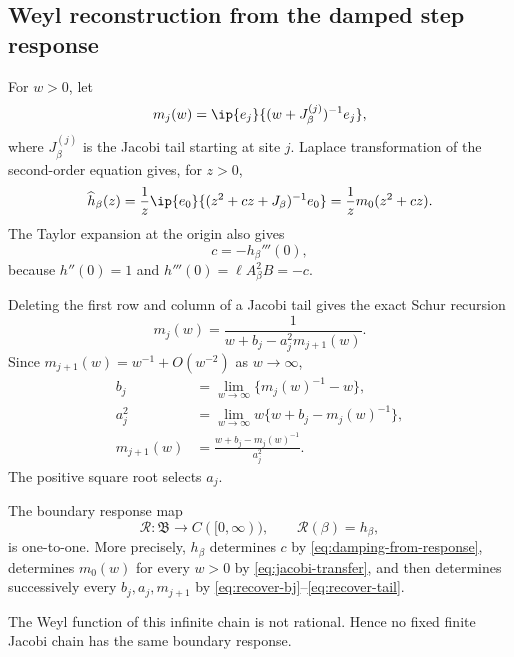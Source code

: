 \subsection{Weyl reconstruction from the damped step response}

For \(w>0\), let
\[
 m_j(w)=\ip{e_j}{(w+J_\beta^{(j)})^{-1}e_j},
\]
where \(J_\beta^{(j)}\) is the Jacobi tail starting at site \(j\).  Laplace
transformation of the second-order equation gives, for \(z>0\),
\begin{equation}
 \widehat h_\beta(z)
 =\frac1z\ip{e_0}{(z^2+cz+J_\beta)^{-1}e_0}
 =\frac1z m_0(z^2+cz).
 \label{eq:jacobi-transfer}
\end{equation}
The Taylor expansion at the origin also gives
\begin{equation}
 c=-h_\beta'''(0),
 \label{eq:damping-from-response}
\end{equation}
because \(h''(0)=1\) and \(h'''(0)=\ell A_\beta^2B=-c\).

Deleting the first row and column of a Jacobi tail gives the exact Schur
recursion
\begin{equation}
 m_j(w)=\frac1{w+b_j-a_j^2m_{j+1}(w)}.
 \label{eq:weyl-recursion}
\end{equation}
Since \(m_{j+1}(w)=w^{-1}+O(w^{-2})\) as \(w\to\infty\),
\begin{align}
 b_j&=\lim_{w\to\infty}\{m_j(w)^{-1}-w\},
 \label{eq:recover-bj}\\
 a_j^2&=\lim_{w\to\infty}
 w\{w+b_j-m_j(w)^{-1}\},
 \label{eq:recover-aj}\\
 m_{j+1}(w)&=\frac{w+b_j-m_j(w)^{-1}}{a_j^2}.
 \label{eq:recover-tail}
\end{align}
The positive square root selects \(a_j\).

\begin{theorem}
\label{thm:jacobi-reconstruction}
The boundary response map
\[
 \mathcal R:\mathfrak B\to C([0,\infty)),
 \qquad \mathcal R(\beta)=h_\beta,
\]
is one-to-one.  More precisely, \(h_\beta\) determines \(c\) by
\eqref{eq:damping-from-response}, determines \(m_0(w)\) for every \(w>0\) by
\eqref{eq:jacobi-transfer}, and then determines successively every
\(b_j,a_j,m_{j+1}\) by
\eqref{eq:recover-bj}--\eqref{eq:recover-tail}.

The Weyl function of this infinite chain is not rational.  Hence no fixed
finite Jacobi chain has the same boundary response.
\end{theorem}

